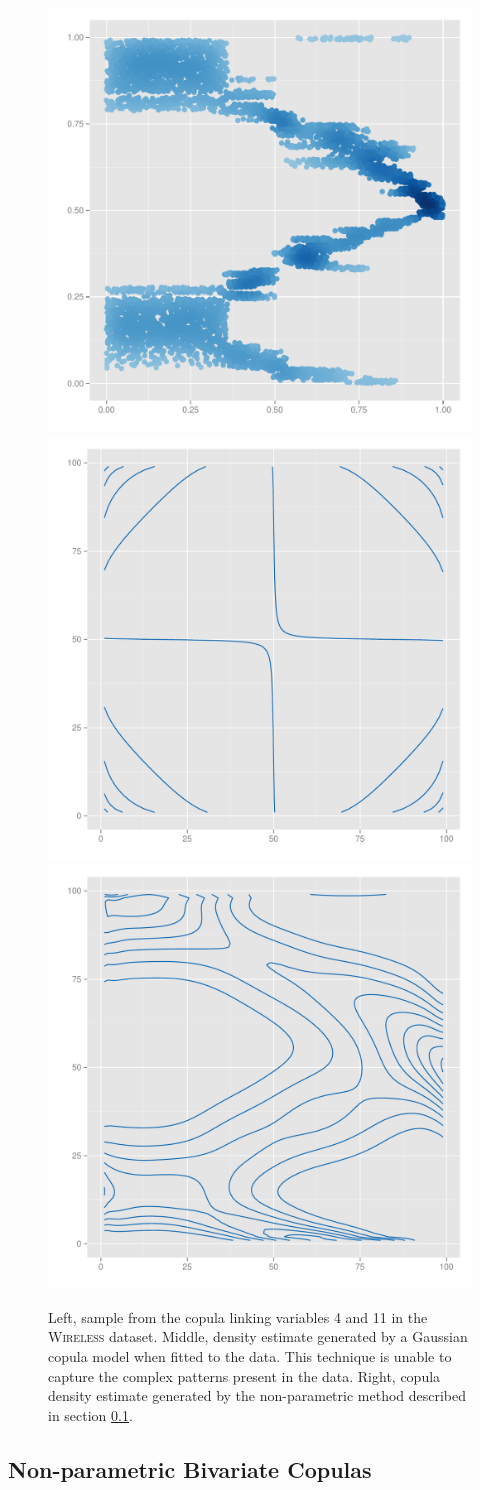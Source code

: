 \documentclass{article}
\begin{document}
\begin{figure}
  \begin{center}
      {\includegraphics[width=0.28\linewidth]{figures/wifi_sample.pdf}}  \hskip 1cm
      {\includegraphics[width=0.28\linewidth]{figures/wifi_gaussian.pdf}}\hskip 1cm
      {\includegraphics[width=0.28\linewidth]{figures/wifi_contour.pdf}}
  \end{center}
  \caption{ Left, sample from the copula linking variables 4 and 11 in the
  \textsc{Wireless} dataset.  Middle, density estimate generated by a Gaussian
  copula model when fitted to the data.  This technique is unable to capture
  the complex patterns present in the data.  Right, copula density estimate
  generated by the non-parametric method described in section
  \ref{sec:kernel_copula}.  }
  \label{fig:complex_density}
\end{figure}


\subsection{Non-parametric Bivariate Copulas}\label{sec:kernel_copula}
\end{document}
